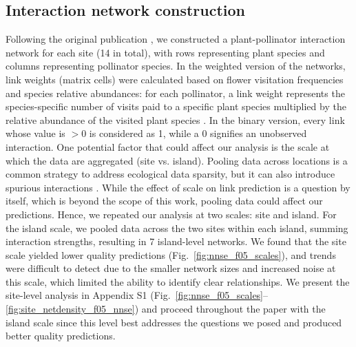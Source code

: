 \documentclass[oneside, a4paper, onecolumn, 11pt]{article}
\begin{document}
\subsection{Interaction network construction}
Following the original publication \citep{Trojelsgaard2015-aq}, we constructed a plant-pollinator interaction network for each site (14 in total), with rows representing plant species and columns representing pollinator species. In the weighted version of the networks, link weights (matrix cells) were calculated based on flower visitation frequencies and species relative abundances: for each pollinator, a link weight represents the species-specific number of visits paid to a specific plant species multiplied by the relative abundance of the visited plant species \citep{Trojelsgaard2015-aq}. In the binary version, every link whose value is $>0$ is considered as 1, while a 0 signifies an unobserved interaction.
One potential factor that could affect our analysis is the scale at which the data are aggregated (site vs. island). 
Pooling data across locations is a common strategy to address ecological data sparsity, but it can also introduce spurious interactions \citep{Poisot2015-tz,Bluthgen2024-il}. 
While the effect of scale on link prediction is a question by itself, which is beyond the scope of this work, pooling data could affect our predictions. Hence, we repeated our analysis at two scales: site and island. 
For the island scale, we pooled data across the two sites within each island, summing interaction strengths, resulting in 7 island-level networks. 
We found that the site scale yielded lower quality predictions (Fig.~\ref{fig:nnse_f05_scales}), and trends were difficult to detect due to the smaller network sizes and increased noise at this scale, which limited the ability to identify clear relationships. We present the site-level analysis in Appendix S1 (Fig.~\ref{fig:nnse_f05_scales}--\ref{fig:site_netdensity_f05_nnse}) and proceed throughout the paper with the island scale since this level best addresses the questions we posed and produced better quality predictions.
\end{document}
